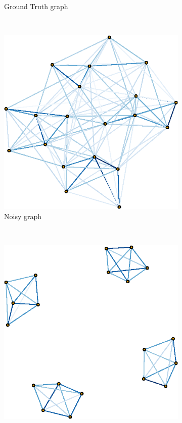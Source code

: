\begin{figure}[!htb]
\begin{subfigure}[b]{0.3\textwidth}
        \caption{Ground Truth graph}
    \end{subfigure}
    ~ %
    \begin{subfigure}[b]{0.3\textwidth}
        \includegraphics[width=\textwidth]{block-diagonal/noisy_graph.eps}
        \caption{Noisy graph}
    \end{subfigure}
    ~ %
    \begin{subfigure}[b]{0.3\textwidth}
        \includegraphics[width=\textwidth]{block-diagonal/est_graph.eps}

\end{subfigure}
\end{figure}
